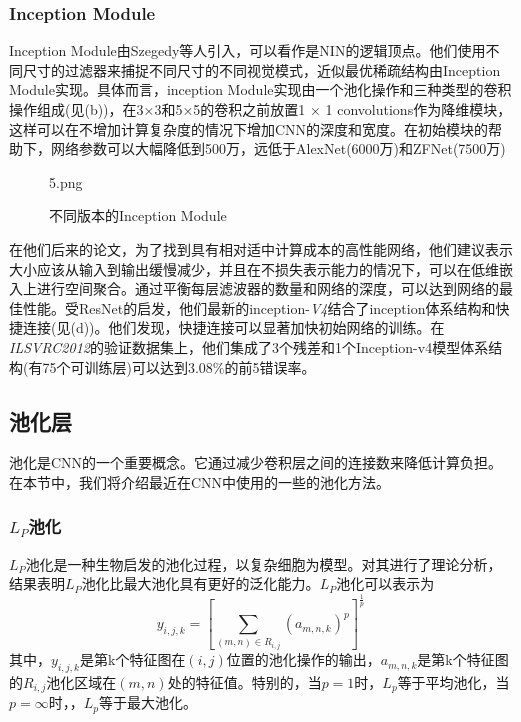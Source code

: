\documentclass[final]{cvpr}
\begin{document}
\subsubsection{Inception Module}
Inception Module由Szegedy等人引入，可以看作是NIN的逻辑顶点。他们使用不同尺寸的过滤器来捕捉不同尺寸的不同视觉模式，近似最优稀疏结构由Inception Module实现。具体而言，inception Module实现由一个池化操作和三种类型的卷积操作组成(见(b))，在3×3和5×5的卷积之前放置1 × 1 convolutions作为降维模块，这样可以在不增加计算复杂度的情况下增加CNN的深度和宽度。在初始模块的帮助下，网络参数可以大幅降低到500万，远低于AlexNet(6000万)和ZFNet(7500万)
\begin{figure}[t!]
	\begin{overpic}[width=\columnwidth]{5.png}
	\end{overpic}
	\caption{不同版本的Inception Module
	}\label{fig:Inceptionmodule}
\end{figure}

在他们后来的论文，为了找到具有相对适中计算成本的高性能网络，他们建议表示大小应该从输入到输出缓慢减少，并且在不损失表示能力的情况下，可以在低维嵌入上进行空间聚合。通过平衡每层滤波器的数量和网络的深度，可以达到网络的最佳性能。受ResNet的启发，他们最新的inception-\emph{V4}结合了inception体系结构和快捷连接(见(d))。他们发现，快捷连接可以显著加快初始网络的训练。在\emph{ILSVRC2012}的验证数据集上，他们集成了3个残差和1个Inception-v4模型体系结构(有75个可训练层)可以达到$3.08\%$的前5错误率。

\subsection{池化层}
池化是CNN的一个重要概念。它通过减少卷积层之间的连接数来降低计算负担。在本节中，我们将介绍最近在CNN中使用的一些的池化方法。
\subsubsection{\emph{$L_P$}池化}
\emph{$L_P$}池化是一种生物启发的池化过程，以复杂细胞为模型。对其进行了理论分析，结果表明\emph{$L_P$}池化比最大池化具有更好的泛化能力。\emph{$L_P$}池化可以表示为
\begin{equation}
	y_{i,j,k} = [\sum_{(m,n)\in R_{i,j}}(a_{m,n,k})^p]^{\frac{1}{p}}
\end{equation}
其中，$y_{i,j,k}$是第k个特征图在$(i, j)$位置的池化操作的输出，$a_{m,n,k}$是第k个特征图的$R_{i,j}$池化区域在$(m, n)$处的特征值。特别的，当$p = 1$时，\emph{$L_p$}等于平均池化，当$p =\infty$时，，\emph{$L_p$}等于最大池化。
\end{document}
